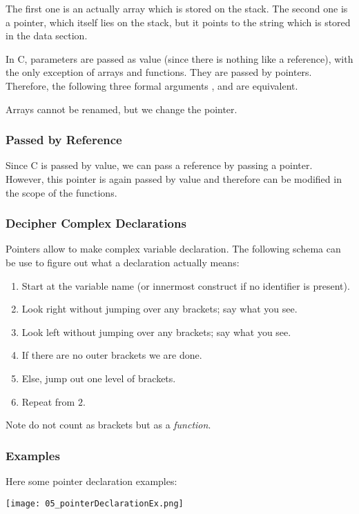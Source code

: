 The first one is an actually array which is stored on the stack. The second one is a pointer, which itself lies on the stack, but it points to the string which is stored in the data section.

In C, parameters are passed as value (since there is nothing like a reference), with the only exception of arrays and functions. They are passed by pointers. Therefore, the following three formal arguments ,  and  are equivalent.

Arrays cannot be renamed, but we change the pointer.

\subsubsection{Passed by Reference}
Since C is passed by value, we can pass a reference by passing a pointer. However, this pointer is again passed by value and therefore can be modified in the scope of the functions.

\subsubsection{Decipher Complex Declarations}
Pointers allow to make complex variable declaration. The following schema can be use to figure out what a declaration actually means:

\begin{enumerate}
    \item Start at the variable name (or innermost construct if no identifier is present).
    \item Look right without jumping over any brackets; say what you see.
    \item Look left without jumping over any brackets; say what you see.
    \item If there are no outer brackets we are done.
    \item Else, jump out one level of brackets.
    \item Repeat from $2$.
\end{enumerate}

Note \code{()} do not count as brackets but as a \textit{function}.

\subsubsection{Examples}
Here some pointer declaration examples:

\texttt{[image: 05\_pointerDeclarationEx.png]}
